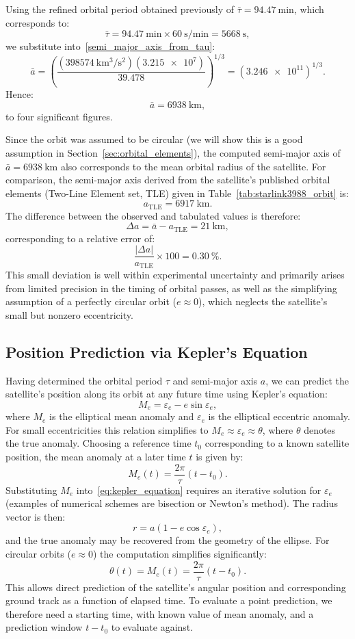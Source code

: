 \documentclass{article}
\begin{document}
Using the refined orbital period obtained previously of $\bar{\tau} = \SI{94.47}{\minute}$, which corresponds to:
\[
\bar{\tau} = \SI{94.47}{\minute} \times \SI{60}{\second\per\minute} = \SI{5668}{\second},
\]
we substitute into~\eqref{semi_major_axis_from_tau}:
\[
\bar{a} = \left( \frac{(\SI{398574}{\kilo\metre^{3}\per\second^{2}}) (\num{3.215e7})}{\num{39.478}} \right)^{1/3}
   = \left( \num{3.246e11} \right)^{1/3}.
\]
Hence:
\[
\boxed{\bar{a} = \SI{6938}{\kilo\metre}},
\]
to four significant figures.

Since the orbit was assumed to be circular (we will show this is a good assumption in Section~\ref{sec:orbital_elements}), the computed semi-major axis of $\bar{a} = \SI{6938}{\kilo\metre}$ also corresponds to the mean orbital radius of the satellite.  
For comparison, the semi-major axis derived from the satellite’s published orbital elements (Two-Line Element set, TLE) given in Table~\ref{tab:starlink3988_orbit} is:
\[
a_{\text{TLE}} = \SI{6917}{\kilo\metre}.
\]
The difference between the observed and tabulated values is therefore:
\[
\Delta a = \bar{a} - a_{\text{TLE}} = \SI{21}{\kilo\metre},
\]
corresponding to a relative error of:
\[
\frac{|\Delta a|}{a_{\text{TLE}}} \times 100 = \SI{0.30}{\percent}.
\]
This small deviation is well within experimental uncertainty and primarily arises from limited precision in the timing of orbital passes, as well as the simplifying assumption of a perfectly circular orbit ($e \approx 0$), which neglects the satellite’s small but nonzero eccentricity.

\subsection{Position Prediction via Kepler’s Equation}

Having determined the orbital period $\tau$ and semi-major axis $a$, we can predict the satellite’s position along its orbit at any future time using Kepler’s equation:
\begin{equation}
    \label{eq:kepler_equation}
    M_e = \varepsilon_e - e\sin \varepsilon_e,
\end{equation}
where $M_e$ is the elliptical mean anomaly and $\varepsilon_e$ is the elliptical eccentric anomaly. For small eccentricities this relation simplifies to $M_e \approx \varepsilon_e \approx \theta$, where $\theta$ denotes the true anomaly. Choosing a reference time $t_0$ corresponding to a known satellite position, the mean anomaly at a later time $t$ is given by:
\[
M_e(t) = \frac{2\pi}{\tau}(t - t_0).
\]
Substituting $M_e$ into~\eqref{eq:kepler_equation} requires an iterative solution for $\varepsilon_e$ (examples of numerical schemes are bisection or Newton's method). The radius vector is then:
\[
r = a(1 - e\cos \varepsilon_e),
\]
and the true anomaly may be recovered from the geometry of the ellipse. For circular orbits ($e \approx 0$) the computation simplifies significantly:
\[
\theta(t) = M_e(t) = \frac{2\pi}{\tau}(t - t_0).
\]
This allows direct prediction of the satellite’s angular position and corresponding ground track as a function of elapsed time. To evaluate a point prediction, we therefore need a starting time, with known value of mean anomaly, and a prediction window $t - t_0$ to evaluate against. 
\end{document}
